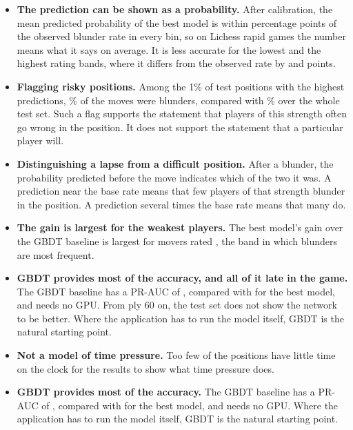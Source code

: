 \documentclass[11pt]{article}
\begin{document}
\begin{itemize}
\item \textbf{The prediction can be shown as a probability.} After
calibration, the mean predicted probability of the best model is within
 percentage points of the observed blunder
rate in every bin, so on Lichess rapid games the number means what it says on
average.\iflook{} It is less accurate for the lowest and the highest rating
bands, where it differs from the observed rate by
 and 
points.\fi
\iflook
\item \textbf{Flagging risky positions.} Among the 1\% of test positions
with the highest predictions, \% of the moves were
blunders, compared with \% over the whole test set. Such a
flag supports the statement that players of this strength often go wrong in
the position. It does not support the statement that a particular player
will.
\item \textbf{Distinguishing a lapse from a difficult position.} After a
blunder, the probability predicted before the move indicates which of the two
it was. A prediction near the base rate means that few players of that
strength blunder in the position. A prediction several times the base rate
means that many do.
\item \textbf{The gain is largest for the weakest players.} The best model's
gain over the GBDT baseline is largest for movers rated
, the band in which blunders are most
frequent.
\item \textbf{GBDT provides most of the accuracy, and all of it late in the
game.} The GBDT baseline has a PR-AUC of , compared with
 for the best model, and needs no GPU. From ply 60 on, the test
set does not show the network to be better. Where the application has to run
the model itself, GBDT is the natural starting point.
\item \textbf{Not a model of time pressure.} Too few of the positions have
little time on the clock for the results to show what time pressure does.
\else
\item \textbf{GBDT provides most of the accuracy.} The GBDT baseline has a
PR-AUC of , compared with  for the best
model, and needs no GPU. Where the application has to run the model itself,
GBDT is the natural starting point.
\fi
\end{itemize}
\end{document}
